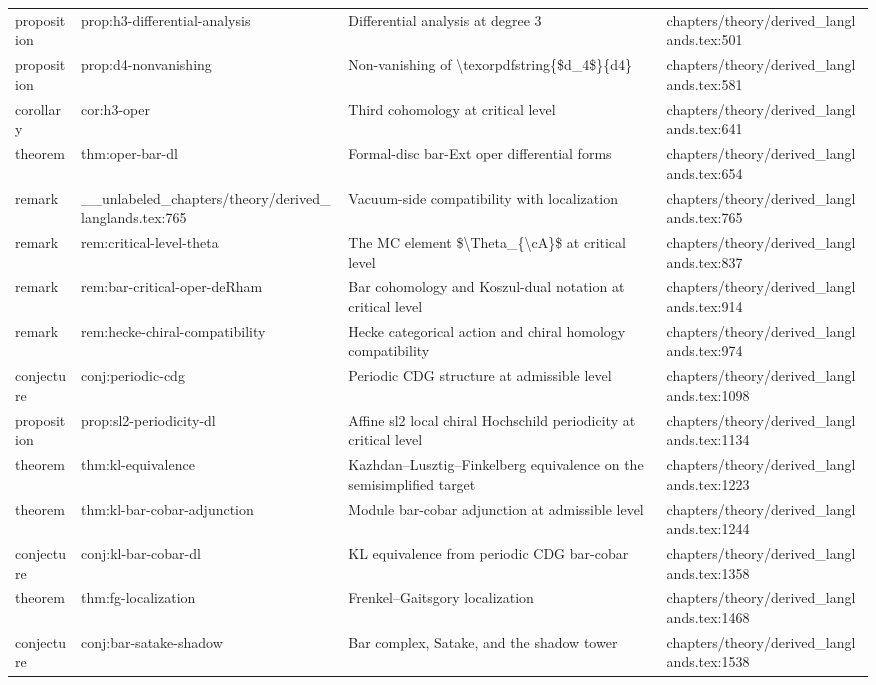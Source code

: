 \documentclass[11pt]{article}
\begin{document}
\begin{longtable}{L{0.10\textwidth}L{0.26\textwidth}L{0.42\textwidth}L{0.22\textwidth}}
proposition & prop:h3-differential-analysis & Differential analysis at degree 3 & chapters/theory/derived\_langlands.tex:501\\
proposition & prop:d4-nonvanishing & Non-vanishing of \textbackslash{}texorpdfstring\{\$d\_4\$\}\{d4\} & chapters/theory/derived\_langlands.tex:581\\
corollary & cor:h3-oper & Third cohomology at critical level & chapters/theory/derived\_langlands.tex:641\\
theorem & thm:oper-bar-dl & Formal-disc bar-Ext oper differential forms & chapters/theory/derived\_langlands.tex:654\\
remark & \_\_unlabeled\_chapters/theory/derived\_langlands.tex:765 & Vacuum-side compatibility with localization & chapters/theory/derived\_langlands.tex:765\\
remark & rem:critical-level-theta & The MC element \$\textbackslash{}Theta\_\{\textbackslash{}cA\}\$ at critical level & chapters/theory/derived\_langlands.tex:837\\
remark & rem:bar-critical-oper-deRham & Bar cohomology and Koszul-dual notation at critical level & chapters/theory/derived\_langlands.tex:914\\
remark & rem:hecke-chiral-compatibility & Hecke categorical action and chiral homology compatibility & chapters/theory/derived\_langlands.tex:974\\
conjecture & conj:periodic-cdg & Periodic CDG structure at admissible level & chapters/theory/derived\_langlands.tex:1098\\
proposition & prop:sl2-periodicity-dl & Affine sl2 local chiral Hochschild periodicity at critical level & chapters/theory/derived\_langlands.tex:1134\\
theorem & thm:kl-equivalence & Kazhdan--Lusztig--Finkelberg equivalence on the semisimplified target & chapters/theory/derived\_langlands.tex:1223\\
theorem & thm:kl-bar-cobar-adjunction & Module bar-cobar adjunction at admissible level & chapters/theory/derived\_langlands.tex:1244\\
conjecture & conj:kl-bar-cobar-dl & KL equivalence from periodic CDG bar-cobar & chapters/theory/derived\_langlands.tex:1358\\
theorem & thm:fg-localization & Frenkel--Gaitsgory localization & chapters/theory/derived\_langlands.tex:1468\\
conjecture & conj:bar-satake-shadow & Bar complex, Satake, and the shadow tower & chapters/theory/derived\_langlands.tex:1538\\

\end{longtable}
\end{document}
